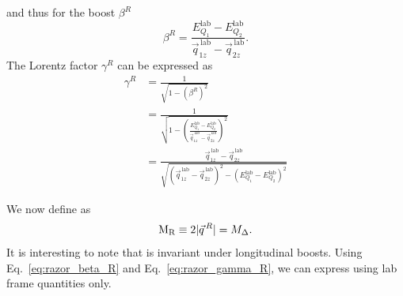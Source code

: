 and thus for the boost $\beta^R$
\begin{equation}
  \beta^R = \frac{E_{Q_1}^{\textrm{lab}} - E_{Q_2}^{\textrm{lab}}}{\vec{q}_{1z}^{\,\textrm{lab}} -
\vec{q}_{2z}^{\,\textrm{lab}}} . \label{eq:razor_beta_R}
\end{equation}
The Lorentz factor $\gamma^R$ can be expressed as
\begin{align}
  \gamma^R &= \frac{1}{\sqrt{1 - (\beta^R)^2}} \\
	   &= \frac{1}{\sqrt{1 - \left( \frac{E_{Q_1}^{\textrm{lab}} -
E_{Q_2}^{\textrm{lab}}}{\vec{q}_{1z}^{\,\textrm{lab}} -
\vec{q}_{2z}^{\,\textrm{lab}}} \right)^2}} \\
           &= \frac{ \vec{q}_{1z}^{\,\textrm{lab}} - \vec{q}_{2z}^{\,\textrm{lab}} }{\sqrt{ \left(
 \vec{q}_{1z}^{\,\textrm{lab}} - \vec{q}_{2z}^{\,\textrm{lab}} \right)^2 - \left(
 E_{Q_1}^{\textrm{lab}} - E_{Q_2}^{\textrm{lab}}\right)^2 }} \label{eq:razor_gamma_R}
\end{align}

We now define \mr as
\begin{equation}
  \mathrm{M_R} \equiv 2 |\vec{q}^{\,R}| = M_\Delta .
\end{equation}
It is interesting to note that \mr is invariant under longitudinal boosts. Using
Eq.~\ref{eq:razor_beta_R} and Eq.~\ref{eq:razor_gamma_R}, we can express \mr using lab frame
quantities only. 

